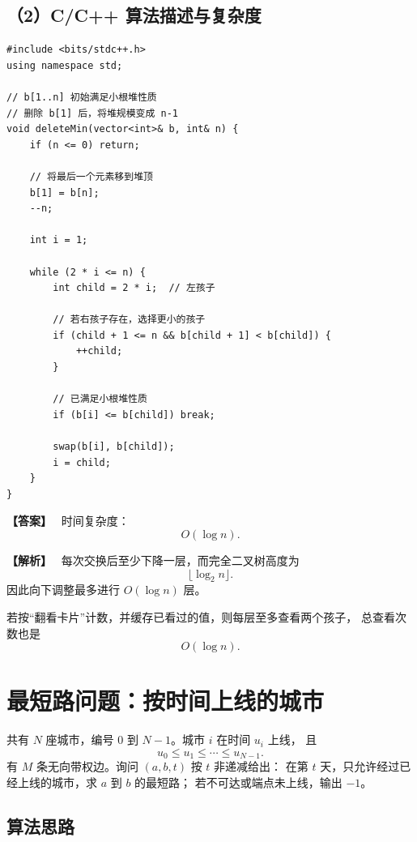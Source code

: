 \documentclass[12pt,a4paper]{ctexart}
\newenvironment{solution}
{\par\noindent\textbf{\color{answerblue}【解析】}\ }
{\par}
\newenvironment{answer}
{\par\noindent\textbf{\color{darkgreen}【答案】}\ }
{\par}
\begin{document}
\subsection*{（2）C/C++ 算法描述与复杂度}

\begin{lstlisting}
#include <bits/stdc++.h>
using namespace std;

// b[1..n] 初始满足小根堆性质
// 删除 b[1] 后，将堆规模变成 n-1
void deleteMin(vector<int>& b, int& n) {
    if (n <= 0) return;

    // 将最后一个元素移到堆顶
    b[1] = b[n];
    --n;

    int i = 1;

    while (2 * i <= n) {
        int child = 2 * i;  // 左孩子

        // 若右孩子存在，选择更小的孩子
        if (child + 1 <= n && b[child + 1] < b[child]) {
            ++child;
        }

        // 已满足小根堆性质
        if (b[i] <= b[child]) break;

        swap(b[i], b[child]);
        i = child;
    }
}
\end{lstlisting}

\begin{answer}
时间复杂度：
\[
\boxed{O(\log n)}.
\]
\end{answer}

\begin{solution}
每次交换后至少下降一层，而完全二叉树高度为
\[
\lfloor\log_2 n\rfloor.
\]
因此向下调整最多进行 $O(\log n)$ 层。

若按“翻看卡片”计数，并缓存已看过的值，则每层至多查看两个孩子，
总查看次数也是
\[
\boxed{O(\log n)}.
\]
\end{solution}

\section{最短路问题：按时间上线的城市}

共有 $N$ 座城市，编号 $0$ 到 $N-1$。城市 $i$ 在时间 $u_i$ 上线，
且
\[
u_0\le u_1\le\cdots\le u_{N-1}.
\]
有 $M$ 条无向带权边。询问 $(a,b,t)$ 按 $t$ 非递减给出：
在第 $t$ 天，只允许经过已经上线的城市，求 $a$ 到 $b$ 的最短路；
若不可达或端点未上线，输出 $-1$。

\subsection*{算法思路}
\end{document}
